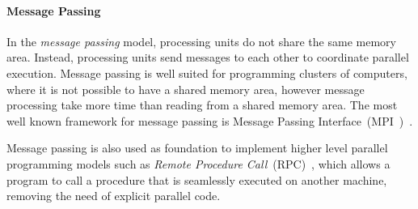 \paragraph{Message Passing}

In the \emph{message passing} model, processing units do not share the same
memory area. Instead, processing units send messages to each other to coordinate
parallel execution. Message passing is well suited for programming clusters of
computers, where it is not possible to have a shared memory area, however
message processing take more time than reading from a shared memory area.  The
most well known framework for message passing is Message Passing
Interface~(MPI~)~\cite{Forum:1994}.

Message passing is also used as foundation to implement higher level parallel
programming models such as \emph{Remote Procedure
Call}~(RPC)~\cite{Birrell:1984}, which allows a program to call a procedure that
is seamlessly executed on another machine, removing the need of explicit
parallel code.

